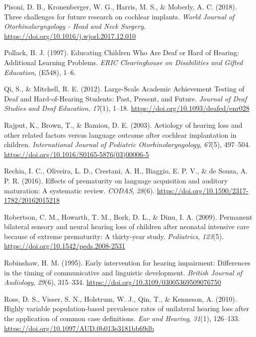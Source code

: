 \documentclass[english,man]{apa6}
\begin{document}
\leavevmode\hypertarget{ref-pisoni2018}{}%
Pisoni, D. B., Kronenberger, W. G., Harris, M. S., \& Moberly, A. C. (2018). Three challenges for future research on cochlear implants. \emph{World Journal of Otorhinolaryngology - Head and Neck Surgery}. \url{https://doi.org/10.1016/j.wjorl.2017.12.010}

\leavevmode\hypertarget{ref-pollack1997}{}%
Pollack, B. J. (1997). Educating Children Who Are Deaf or Hard of Hearing: Additional Learning Problems. \emph{ERIC Clearinghouse on Disabilities and Gifted Education}, (E548), 1--6.

\leavevmode\hypertarget{ref-qi2012}{}%
Qi, S., \& Mitchell, R. E. (2012). Large-Scale Academic Achievement Testing of Deaf and Hard-of-Hearing Students: Past, Present, and Future. \emph{Journal of Deaf Studies and Deaf Education}, \emph{17}(1), 1--18. \url{https://doi.org/10.1093/deafed/enr028}

\leavevmode\hypertarget{ref-rajput2003}{}%
Rajput, K., Brown, T., \& Bamiou, D. E. (2003). Aetiology of hearing loss and other related factors versus language outcome after cochlear implantation in children. \emph{International Journal of Pediatric Otorhinolaryngology}, \emph{67}(5), 497--504. \url{https://doi.org/10.1016/S0165-5876(03)00006-5}

\leavevmode\hypertarget{ref-rechia2016}{}%
Rechia, I. C., Oliveira, L. D., Crestani, A. H., Biaggio, E. P. V., \& de Souza, A. P. R. (2016). Effects of prematurity on language acquisition and auditory maturation: A systematic review. \emph{CODAS}, \emph{28}(6). \url{https://doi.org/10.1590/2317-1782/20162015218}

\leavevmode\hypertarget{ref-robertson2009}{}%
Robertson, C. M., Howarth, T. M., Bork, D. L., \& Dinu, I. A. (2009). Permanent bilateral sensory and neural hearing loss of children after neonatal intensive care because of extreme prematurity: A thirty-year study. \emph{Pediatrics}, \emph{123}(5). \url{https://doi.org/10.1542/peds.2008-2531}

\leavevmode\hypertarget{ref-robinshaw1995}{}%
Robinshaw, H. M. (1995). Early intervention for hearing impairment: Differences in the timing of communicative and linguistic development. \emph{British Journal of Audiology}, \emph{29}(6), 315--334. \url{https://doi.org/10.3109/03005369509076750}

\leavevmode\hypertarget{ref-ross2010}{}%
Ross, D. S., Visser, S. N., Holstrum, W. J., Qin, T., \& Kenneson, A. (2010). Highly variable population-based prevalence rates of unilateral hearing loss after the application of common case definitions. \emph{Ear and Hearing}, \emph{31}(1), 126--133. \url{https://doi.org/10.1097/AUD.0b013e3181bb69db}
\end{document}
